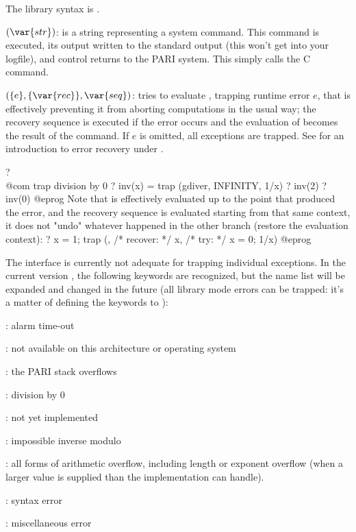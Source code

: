 The library syntax is .

$(\var{str})$: \label{se:system} is a string representing a system command. This command is
executed, its output written to the standard output (this won't get into your
logfile), and control returns to the PARI system. This simply calls the C
 command.

$(\{e\}, \{\var{rec}\}, \var{seq})$: \label{se:trap}tries to
evaluate , trapping runtime error $e$, that is effectively preventing
it from aborting computations in the usual way; the recovery sequence
 is executed if the error occurs and the evaluation of 
becomes the result of the command. If $e$ is omitted, all exceptions are
trapped. See  for an introduction to error recovery
under .

\bprog
? \\@com trap division by 0
? inv(x) = trap (gdiver, INFINITY, 1/x)
? inv(2)
? inv(0)
@eprog\noindent
Note that  is effectively evaluated up to the point that produced
the error, and the recovery sequence is evaluated starting from that same
context, it does not "undo" whatever happened in the other branch (restore
the evaluation context):
\bprog
? x = 1; trap (, /* recover: */ x, /* try: */ x = 0; 1/x)
@eprog

 The interface is currently not adequate for trapping
individual exceptions. In the current version \vers, the following keywords
are recognized, but the name list will be expanded and changed in the
future (all library mode errors can be trapped: it's a matter of defining
the keywords to ):

: alarm time-out

: not available on this architecture or operating system

: the PARI stack overflows

: division by 0

: not yet implemented

: impossible inverse modulo

: all forms of arithmetic overflow, including length
or exponent overflow (when a larger value is supplied than the
implementation can handle).

: syntax error

: miscellaneous error

